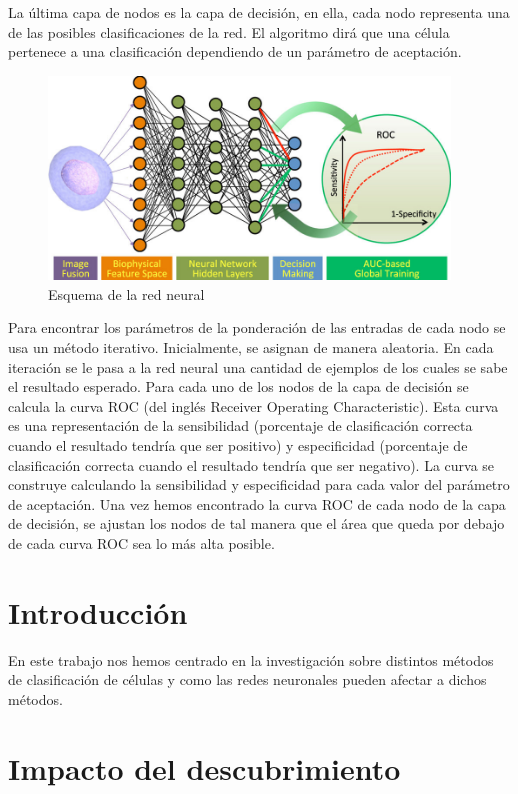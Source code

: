 \documentclass[a4paper, 12pt, UTF8]{article}
\begin{document}
La última capa de nodos es la capa de decisión, en ella, cada nodo representa una de las posibles clasificaciones de la red. El algoritmo dirá que una célula pertenece a una clasificación dependiendo de un parámetro de aceptación.

\begin{figure}[h!]
	\centering
	\includegraphics[width=0.95\textwidth]{neural}
	\caption{Esquema de la red neural}
	\label{fig:neural}
\end{figure}

Para encontrar los parámetros de la ponderación de las entradas de cada nodo se usa un método iterativo. Inicialmente, se asignan de manera aleatoria. En cada iteración se le pasa a la red neural una cantidad de ejemplos de los cuales se sabe el resultado esperado. Para cada uno de los nodos de la capa de decisión se calcula la curva ROC (del inglés Receiver Operating Characteristic). Esta curva es una representación de la sensibilidad (porcentaje de clasificación correcta cuando el resultado tendría que ser positivo) y especificidad (porcentaje de clasificación correcta cuando el resultado tendría que ser negativo). La curva se construye calculando la sensibilidad y especificidad para cada valor del parámetro de aceptación. Una vez hemos encontrado la curva ROC de cada nodo de la capa de decisión,  se ajustan los nodos de tal manera que el área que queda por debajo de cada curva ROC sea lo más alta posible.


\section{Introducción}

En este trabajo nos hemos centrado en la investigación sobre distintos métodos de clasificación de células y como las redes neuronales pueden afectar a dichos métodos.

\section{Impacto del descubrimiento}
\end{document}
